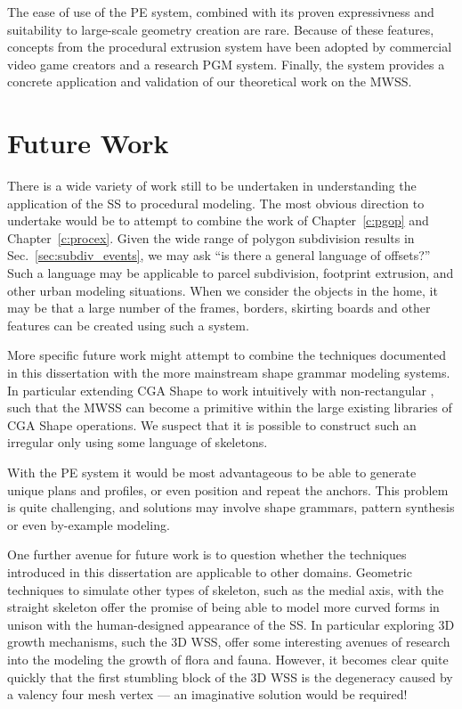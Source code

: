 The ease of use of the PE system, combined with its proven expressivness and suitability to large-scale geometry creation are rare. Because of these features, concepts from the procedural extrusion system have been adopted by commercial video game creators and a research PGM system. Finally, the system provides a concrete application and validation of our theoretical work on the MWSS.


\section{Future Work}

There is a wide variety of work still to be undertaken in understanding the application of the SS to procedural modeling. The most obvious direction to undertake would be to attempt to combine the work of Chapter~\ref{c:pgop} and Chapter~\ref{c:procex}. Given the wide range of polygon subdivision results in Sec.~\ref{sec:subdiv_events}, we may ask ``is there a general language of offsets?'' Such a language may be applicable to parcel subdivision, footprint extrusion, and other urban modeling situations. When we consider the objects in the home, it may be that a large number of the frames, borders, skirting boards and other features can be created using such a system.

More specific future work might attempt to combine the techniques documented in this dissertation with the more mainstream shape grammar modeling systems. In particular extending CGA Shape\cite{Pascal06} to work intuitively with non-rectangular \facades{}, such that the MWSS can become a primitive within the large existing libraries of CGA Shape operations. We suspect that it is possible to construct such an irregular \facade{} only using some language of skeletons.

With the PE system it would be most advantageous to be able to generate unique plans and profiles, or even position and repeat the anchors. This problem is quite challenging, and solutions may involve shape grammars, pattern synthesis or even by-example modeling.

One further avenue for future work is to question whether the techniques introduced in this dissertation are applicable to other domains. Geometric techniques to simulate other types of skeleton, such as the medial axis, with the straight skeleton\cite{Tuanase:2004} offer the promise of being able to model more curved forms in unison with the human-designed appearance of the SS. In particular exploring 3D growth mechanisms, such the 3D WSS, offer some interesting avenues of research into the modeling the growth of flora and fauna. However, it becomes clear quite quickly that the first stumbling block of the 3D WSS is the degeneracy caused by a valency four mesh vertex --- an imaginative solution would be required!

